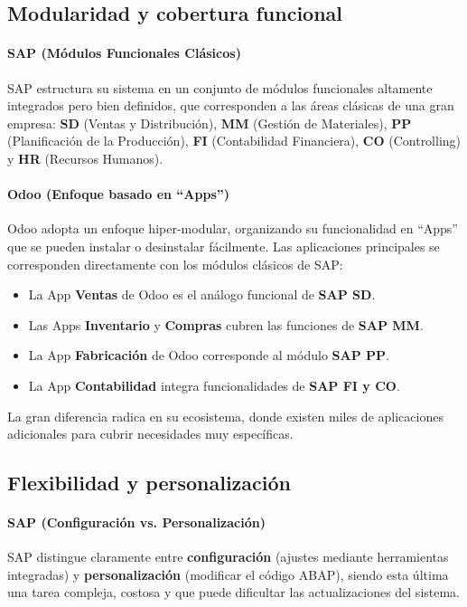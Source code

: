 \documentclass[12pt,letterpaper,spanish]{report}
\begin{document}
\subsection{Modularidad y cobertura funcional}

\paragraph{SAP (Módulos Funcionales Clásicos)}
SAP estructura su sistema en un conjunto de módulos funcionales altamente integrados pero bien definidos, que corresponden a las áreas clásicas de una gran empresa: \textbf{SD} (Ventas y Distribución), \textbf{MM} (Gestión de Materiales), \textbf{PP} (Planificación de la Producción), \textbf{FI} (Contabilidad Financiera), \textbf{CO} (Controlling) y \textbf{HR} (Recursos Humanos).

\paragraph{Odoo (Enfoque basado en ``Apps'')}
Odoo adopta un enfoque hiper-modular, organizando su funcionalidad en ``Apps'' que se pueden instalar o desinstalar fácilmente. Las aplicaciones principales se corresponden directamente con los módulos clásicos de SAP:
\begin{itemize}
    \item La App \textbf{Ventas} de Odoo es el análogo funcional de \textbf{SAP SD}.
    \item Las Apps \textbf{Inventario} y \textbf{Compras} cubren las funciones de \textbf{SAP MM}.
    \item La App \textbf{Fabricación} de Odoo corresponde al módulo \textbf{SAP PP}.
    \item La App \textbf{Contabilidad} integra funcionalidades de \textbf{SAP FI y CO}.
\end{itemize}
La gran diferencia radica en su ecosistema, donde existen miles de aplicaciones adicionales para cubrir necesidades muy específicas.

\subsection{Flexibilidad y personalización}

\paragraph{SAP (Configuración vs. Personalización)}
SAP distingue claramente entre \textbf{configuración} (ajustes mediante herramientas integradas) y \textbf{personalización} (modificar el código ABAP), siendo esta última una tarea compleja, costosa y que puede dificultar las actualizaciones del sistema.
\end{document}
